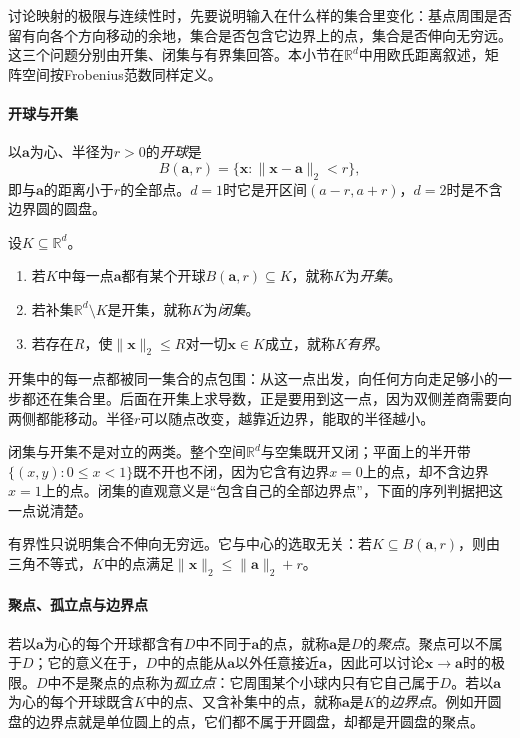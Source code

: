 讨论映射的极限与连续性时，先要说明输入在什么样的集合里变化：基点周围是否留有向各个方向移动的余地，集合是否包含它边界上的点，集合是否伸向无穷远。这三个问题分别由开集、闭集与有界集回答。本小节在$\mathbb R^d$中用欧氏距离叙述，矩阵空间按Frobenius范数同样定义。

\paragraph{开球与开集}
以$\bm a$为心、半径为$r>0$的\emph{开球}是
\[
 B(\bm a,r)=\{\bm x:\lVert\bm x-\bm a\rVert_2<r\},
\]
即与$\bm a$的距离小于$r$的全部点。$d=1$时它是开区间$(a-r,a+r)$，$d=2$时是不含边界圆的圆盘。
\begin{definition}[开集、闭集与有界集]
\label{def:multivariable-open-closed-bounded}
设$K\subseteq\mathbb R^d$。
\begin{enumerate}
 \item 若$K$中每一点$\bm a$都有某个开球$B(\bm a,r)\subseteq K$，就称$K$为\emph{开集}。
 \item 若补集$\mathbb R^d\setminus K$是开集，就称$K$为\emph{闭集}。
 \item 若存在$R$，使$\lVert\bm x\rVert_2\leq R$对一切$\bm x\in K$成立，就称$K$\emph{有界}。
\end{enumerate}
\end{definition}
开集中的每一点都被同一集合的点包围：从这一点出发，向任何方向走足够小的一步都还在集合里。后面在开集上求导数，正是要用到这一点，因为双侧差商需要向两侧都能移动。半径$r$可以随点改变，越靠近边界，能取的半径越小。

闭集与开集不是对立的两类。整个空间$\mathbb R^d$与空集既开又闭；平面上的半开带$\{(x,y):0\leq x<1\}$既不开也不闭，因为它含有边界$x=0$上的点，却不含边界$x=1$上的点。闭集的直观意义是“包含自己的全部边界点”，下面的序列判据把这一点说清楚。

有界性只说明集合不伸向无穷远。它与中心的选取无关：若$K\subseteq B(\bm a,r)$，则由三角不等式，$K$中的点满足$\lVert\bm x\rVert_2\leq\lVert\bm a\rVert_2+r$。

\paragraph{聚点、孤立点与边界点}
若以$\bm a$为心的每个开球都含有$D$中不同于$\bm a$的点，就称$\bm a$是$D$的\emph{聚点}。聚点可以不属于$D$；它的意义在于，$D$中的点能从$\bm a$以外任意接近$\bm a$，因此可以讨论$\bm x\to\bm a$时的极限。$D$中不是聚点的点称为\emph{孤立点}：它周围某个小球内只有它自己属于$D$。若以$\bm a$为心的每个开球既含$K$中的点、又含补集中的点，就称$\bm a$是$K$的\emph{边界点}。例如开圆盘的边界点就是单位圆上的点，它们都不属于开圆盘，却都是开圆盘的聚点。


